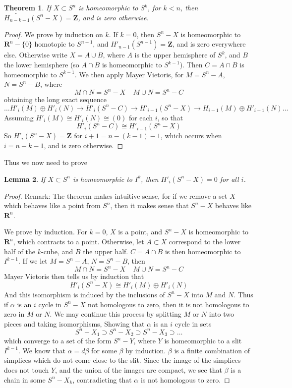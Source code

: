 \documentclass{article}
\theoremstyle{plain}
\newtheorem{theorem}{Theorem}
\newtheorem{lemma}[theorem]{Lemma}
\begin{document}
\begin{theorem}
    If $X \subset S^n$ is homeomorphic to $S^k$, for $k < n$, then $\widetilde{H_{n-k-1}}(S^n - X) = \mathbf{Z}$, and is zero otherwise.
\end{theorem}
\begin{proof}
    We prove by induction on $k$. If $k = 0$, then $S^n - X$ is homeomorphic to $\mathbf{R}^n - \{ 0 \}$ homotopic to $S^{n-1}$, and $H'_{n-1}(S^{n-1}) = \mathbf{Z}$, and is zero everywhere else. Otherwise write $X = A \cup B$, where $A$ is the upper hemisphere of $S^k$, and $B$ the lower hemisphere (so $A \cap B$ is homeomorphic to $S^{k-1}$). Then $C = A \cap B$ is homeomorphic to $S^{k-1}$. We then apply Mayer Vietoris, for $M = S^n - A$, $N = S^n - B$, where
    \[ M \cap N = S^n - X\ \ \ \ \ M \cup N = S^n - C \]
    obtaining the long exact sequence
    \[ \dots H'_i(M) \oplus H'_i(N) \to H'_i(S^n - C) \to H'_{i-1}(S^n - X) \to H_{i-1}(M) \oplus H'_{i-1}(N) \dots \]
    Assuming $H'_i(M) \cong H'_i(N) \cong (0)$ for each $i$, so that
    \[ H'_i(S^n - C) \cong H'_{i-1}(S^n - X) \]
    So $H'_i(S^n - X) = \mathbf{Z}$ for $i+1 = n-(k-1)-1$, which occurs when $i = n-k-1$, and is zero otherwise.
\end{proof}

Thus we now need to prove

\begin{lemma}
    If $X \subset S^n$ is homeomorphic to $I^k$, then $H'_i(S^n - X) = 0$ for all $i$.
\end{lemma}
\begin{proof}
    Remark: The theorem makes intuitive sense, for if we remove a set $X$ which behaves like a point from $S^n$, then it makes sense that $S^n - X$ behaves like $\mathbf{R}^n$.

    We prove by induction. For $k = 0$, $X$ is a point, and $S^n - X$ is homeomorphic to $\mathbf{R}^n$, which contracts to a point. Otherwise, let $A \subset X$ correspond to the lower half of the $k$-cube, and $B$ the upper half. $C = A \cap B$ is then homeomorphic to $I^{k-1}$. If we let $M = S^n - A$, $N = S^n - B$, then
    \[ M \cap N = S^n - X\ \ \ \ \ M \cup N = S^n - C \]
    Mayer Vietoris then tells us by induction that
    \[ H'_i(S^n - X) \cong H'_i(M) \oplus H'_i(N) \]
    And this isomorphism is induced by the inclusions of $S^n - X$ into $M$ and $N$. Thus if $\alpha$ is an $i$ cycle in $S^n - X$ not homologous to zero, then it is not homologous to zero in $M$ or $N$. We may continue this process by splitting $M$ or $N$ into two pieces and taking isomorphisms, Showing that $\alpha$ is an $i$ cycle in sets
    \[ S^n - X_1 \supset S^n - X_2 \supset S^n - X_3 \supset \dots \]
    which converge to a set of the form $S^n - Y$, where $Y$ is homeomorphic to a slit $I^{k-1}$. We know that $\alpha = d \beta$ for some $\beta$ by induction. $\beta$ is a finite combination of simplices which do not come close to the slit. Since the image of the simplices does not touch $Y$, and the union of the images are compact, we see that $\beta$ is a chain in some $S^n - X_k$, contradicting that $\alpha$ is not homologous to zero.
\end{proof}
\end{document}
